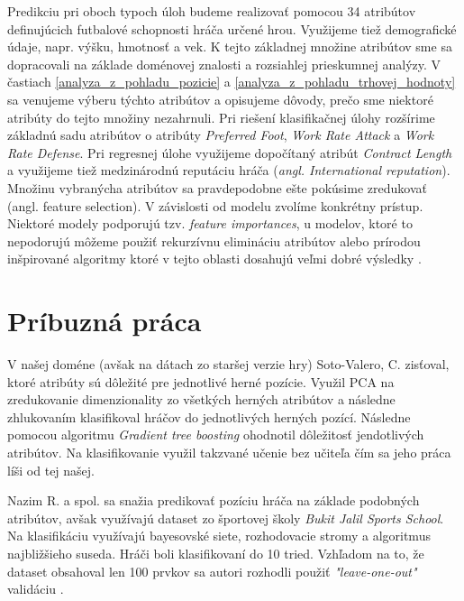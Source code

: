 \documentclass[runningheads]{llncs}
\begin{document}
Predikciu pri oboch typoch úloh budeme realizovať pomocou 34 atribútov definujúcich futbalové schopnosti hráča určené hrou. Využijeme tiež demografické údaje, napr. výšku, hmotnosť a vek. K tejto základnej množine atribútov sme sa dopracovali na základe doménovej znalosti a rozsiahlej prieskumnej analýzy. V častiach \ref{analyza_z_pohladu_pozicie} a \ref{analyza_z_pohladu_trhovej_hodnoty} sa venujeme výberu týchto atribútov a opisujeme dôvody, prečo sme niektoré atribúty do tejto množiny nezahrnuli.
Pri riešení klasifikačnej úlohy rozšírime základnú sadu atribútov o atribúty \textit{Preferred Foot}, \textit{Work Rate Attack} a \textit{Work Rate Defense}. Pri regresnej úlohe využijeme dopočítaný atribút \textit{Contract Length} a využijeme tiež medzinárodnú reputáciu hráča (\textit{angl. International reputation}).
Množinu vybranýcha atribútov sa pravdepodobne ešte pokúsime zredukovať (angl. feature selection). V závislosti od modelu zvolíme konkrétny prístup. Niektoré modely podporujú tzv. \textit{feature importances}, u modelov, ktoré to nepodorujú môžeme použiť rekurzívnu elimináciu atribútov alebo prírodou inšpirované algoritmy ktoré v tejto oblasti dosahujú veľmi dobré výsledky \cite{zawbaa2018large}.

\section{Príbuzná práca}

V našej doméne (avšak na dátach zo staršej verzie hry) Soto-Valero, C. \cite{RICYDE1165} zisťoval, ktoré atribúty sú dôležité pre jednotlivé herné pozície. Využil PCA na zredukovanie dimenzionality zo všetkých herných atribútov a následne zhlukovaním klasifikoval hráčov do jednotlivých herných pozící. Následne pomocou algoritmu \textit{Gradient tree boosting} ohodnotil dôležitosť jendotlivých atribútov. Na klasifikovanie využil takzvané učenie bez učiteľa čím sa jeho práca líši od tej našej.

Nazim R. a spol. sa snažia predikovať pozíciu hráča na základe podobných atribútov, avšak využívajú dataset zo športovej školy  \textit{Bukit Jalil Sports School}. Na klasifikáciu využívajú bayesovské siete, rozhodovacie stromy a algoritmus najbližšieho suseda. Hráči boli klasifikovaní do 10 tried. Vzhľadom na to, že dataset obsahoval len 100 prvkov sa autori rozhodli použiť \textit{"leave-one-out"} validáciu \cite{razali2017}.  
\end{document}
